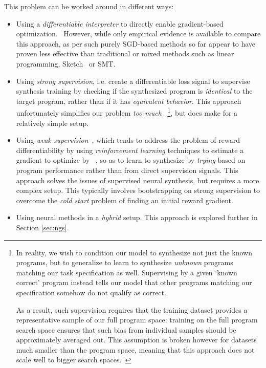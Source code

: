 \documentclass{article}
\begin{document}
This problem can be worked around in different ways:
\begin{itemize}
    \item Using a \emph{differentiable interpreter} to directly enable gradient-based optimization.~\citep{forth,terpret,houdini,feser2016differentiable,rocktaschel2017end,abadi2019simple}
        However, while only empirical evidence is available to compare this approach, as per \citet{terpret} such purely SGD-based methods so far appear to have proven less effective than traditional or mixed methods such as linear programming, Sketch~\citep{solar2008program} or SMT.
    \item Using \emph{strong supervision}, i.e. create a differentiable loss signal
        to supervise synthesis training by checking if the synthesized program is \emph{identical} to the target program,
        rather than if it has \emph{equivalent behavior}.
        This approach unfortunately simplifies our problem \emph{too much}%
        ~\footnote{
            In reality, we wish to condition our model to synthesize not just the known programs,
            but to generalize to learn to synthesize \emph{unknown} programs matching our task specification as well.
            Supervising by a given `known correct' program instead tells our model that other programs matching our specification somehow do not qualify as correct.

            As a result, such supervision requires that the training dataset provides a representative sample of our full program space:
            training on the full program search space ensures that such bias from individual samples should be approximately averaged out.
            This assumption is broken however for datasets much smaller than the program space,
            meaning that this approach does not scale well to bigger search spaces.~\citep{nsps}
        }, but does make for a relatively simple setup.
    \item Using \emph{weak supervision}~\citep{mapo},
        which tends to address the problem of reward differentiability by using \emph{reinforcement learning} techniques to estimate a gradient to optimize by%
        ~\citep{chen2017towards,bunel2018leveraging,xu2019neural,camacho2019towards},
        so as to learn to synthesize by \emph{trying} based on program performance rather than from direct supervision signals.
        This approach solves the issues of supervised neural synthesis,
        but requires a more complex setup.
        This typically involves bootstrapping on strong supervision to overcome the \emph{cold start} problem of finding an initial reward gradient.
    \item Using neural methods in a \emph{hybrid} setup. This approach is explored further in Section \ref{sec:ngs}.
\end{itemize}
\end{document}
